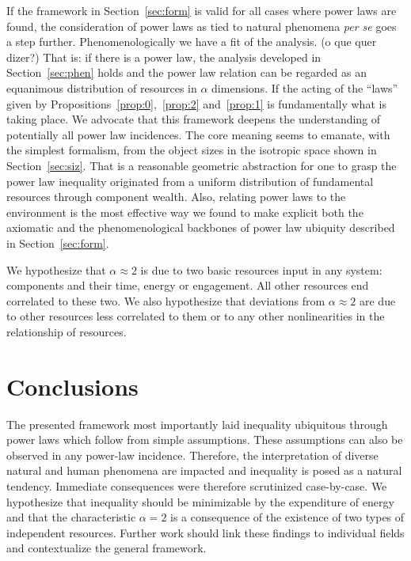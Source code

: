 \documentclass[a4paper, 11pt]{article} %
\begin{document}
If the framework in Section~\ref{sec:form} is valid for all cases where power laws are found, the consideration of power laws as tied to natural phenomena \emph{per se} goes a step further. 
Phenomenologically we have a fit of the analysis. (o que quer dizer?)
That is: if there is a power law, the analysis developed in Section~\ref{sec:phen} holds and the power law relation can be regarded as an equanimous distribution of resources in $\alpha$ dimensions.
If the acting of the ``laws'' given by Propositions~\ref{prop:0},~\ref{prop:2} and~\ref{prop:1} is fundamentally what is taking place. We advocate that this framework deepens the understanding of potentially all power law
incidences. The core meaning seems to emanate, with the simplest formalism, from
the object sizes in the isotropic space shown in Section~\ref{sec:siz}.
That is a reasonable geometric abstraction for
one to grasp the power law inequality originated from
a uniform distribution
of fundamental resources through component wealth.
Also, relating power laws to the environment is the most effective
way we found to make explicit both the axiomatic
and the phenomenological backbones of power law ubiquity described in
Section~\ref{sec:form}.

We hypothesize that $\alpha \approx 2$ is due to two basic resources
input in any system: components and their time, energy or engagement.
All other resources end correlated to these two.
We also hypothesize that deviations from $\alpha \approx 2$ are due
to other resources less correlated to them
or to any other nonlinearities in the relationship of resources.



\section{Conclusions}
The presented framework 
most importantly laid inequality ubiquitous
through power laws which follow from simple assumptions.
These assumptions can also be observed in any power-law incidence.
Therefore, the interpretation of diverse natural and human phenomena 
are impacted and inequality is posed as a natural tendency.
Immediate consequences were therefore scrutinized case-by-case.
We hypothesize that
inequality should be minimizable by the expenditure of energy
and that the characteristic $\alpha=2$ is a consequence of
the existence of two types of independent resources.
Further work should link these findings to individual fields
and contextualize the general framework.
\end{document}
